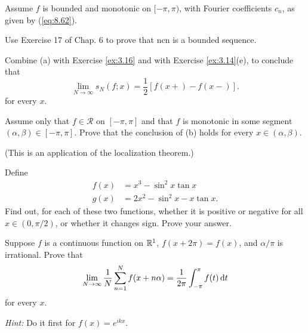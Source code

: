 \begin{myExercise}
    \label{ex:8.17}
    Assume $f$ is bounded and monotonic on $[-\pi, \pi)$, 
    with Fourier coefficients $c_n$, as given by (\ref{eq:8.62}).
    \begin{asparaenum}[(a)]
        \item Use Exercise 17 of Chap. 6 to prove that {ncn} is a bounded sequence.
        \item Combine (a) with Exercise \ref{ex:3.16} and with Exercise \ref{ex:3.14}(e), to conclude that 
        \begin{equation*}
            \lim_{N \to \infty} s_N(f;x) = \frac{1}{2}\left[ f(x+)-f(x-) \right].
        \end{equation*}
        for every $x$.
        \item Assume only that $f \in \mathscr{R}$ on $[-\pi,\pi]$ and that $f$ is monotonic in some segment
        $(\alpha, \beta) \in  [-\pi, \pi]$. 
        Prove that the conclusion of (b) holds for every $x \in (\alpha, \beta)$.
    \end{asparaenum}
    (This is an application of the localization theorem.)
\end{myExercise}


\begin{myExercise}
    \label{ex:8.18}
    Define
    \begin{align*}
        f(x) &= x^3 - \sin^2 x \tan x \\
        g(x) &= 2x^2 - \sin^2 x - x\tan x.
    \end{align*}
    Find out, for each of these two functions, whether it is positive or negative for all $x \in (0, \pi/2)$, or whether it changes sign. 
    Prove your answer.
\end{myExercise}


\begin{myExercise}
    \label{ex:8.19}
    Suppose $f$ is a continuous function on ${\protect\mathbb R}^1$,
    $f(x + 2\pi) = f(x)$, and $\alpha/\pi$ is irrational.
    Prove that
    \begin{equation*}
        \lim_{N \to \infty} \frac{1}{N} \sum_{n=1}^{N} f(x+n\alpha) = \frac{1}{2\pi} \int_{-\pi}^{\pi} f(t) \d t
    \end{equation*}
    for every $x$.

    \emph{Hint:} Do it first for $f(x) = e^{ikx}$.
\end{myExercise}


